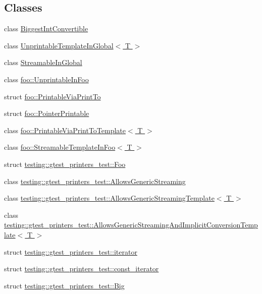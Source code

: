 \subsection*{Classes}
\begin{DoxyCompactItemize}
\item 
class \hyperlink{class_biggest_int_convertible}{Biggest\+Int\+Convertible}
\item 
class \hyperlink{class_unprintable_template_in_global}{Unprintable\+Template\+In\+Global$<$ T $>$}
\item 
class \hyperlink{class_streamable_in_global}{Streamable\+In\+Global}
\item 
class \hyperlink{classfoo_1_1_unprintable_in_foo}{foo\+::\+Unprintable\+In\+Foo}
\item 
struct \hyperlink{structfoo_1_1_printable_via_print_to}{foo\+::\+Printable\+Via\+Print\+To}
\item 
struct \hyperlink{structfoo_1_1_pointer_printable}{foo\+::\+Pointer\+Printable}
\item 
class \hyperlink{classfoo_1_1_printable_via_print_to_template}{foo\+::\+Printable\+Via\+Print\+To\+Template$<$ T $>$}
\item 
class \hyperlink{classfoo_1_1_streamable_template_in_foo}{foo\+::\+Streamable\+Template\+In\+Foo$<$ T $>$}
\item 
struct \hyperlink{structtesting_1_1gtest__printers__test_1_1_foo}{testing\+::gtest\+\_\+printers\+\_\+test\+::\+Foo}
\item 
class \hyperlink{classtesting_1_1gtest__printers__test_1_1_allows_generic_streaming}{testing\+::gtest\+\_\+printers\+\_\+test\+::\+Allows\+Generic\+Streaming}
\item 
class \hyperlink{classtesting_1_1gtest__printers__test_1_1_allows_generic_streaming_template}{testing\+::gtest\+\_\+printers\+\_\+test\+::\+Allows\+Generic\+Streaming\+Template$<$ T $>$}
\item 
class \hyperlink{classtesting_1_1gtest__printers__test_1_1_allows_generic_streaming_and_implicit_conversion_template}{testing\+::gtest\+\_\+printers\+\_\+test\+::\+Allows\+Generic\+Streaming\+And\+Implicit\+Conversion\+Template$<$ T $>$}
\item 
struct \hyperlink{structtesting_1_1gtest__printers__test_1_1iterator}{testing\+::gtest\+\_\+printers\+\_\+test\+::iterator}
\item 
struct \hyperlink{structtesting_1_1gtest__printers__test_1_1const__iterator}{testing\+::gtest\+\_\+printers\+\_\+test\+::const\+\_\+iterator}
\item 
struct \hyperlink{structtesting_1_1gtest__printers__test_1_1_big}{testing\+::gtest\+\_\+printers\+\_\+test\+::\+Big}
\end{DoxyCompactItemize}
